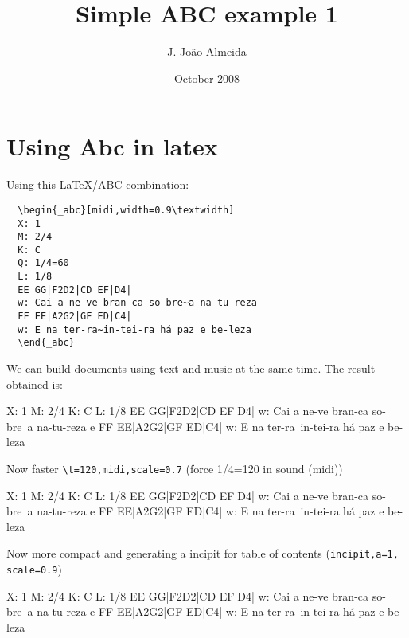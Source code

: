 \documentclass{article}
\begin{document}
\title{Simple ABC example 1}
\author{J. João Almeida}
\date{October 2008}
\maketitle

\tableofcontents

\newpage

\section{Using Abc in latex}

Using this LaTeX/ABC combination:
\begin{Verbatim}
  \begin{_abc}[midi,width=0.9\textwidth]
  X: 1
  M: 2/4
  K: C
  Q: 1/4=60
  L: 1/8
  EE GG|F2D2|CD EF|D4|
  w: Cai a ne-ve bran-ca so-bre~a na-tu-reza 
  FF EE|A2G2|GF ED|C4|
  w: E na ter-ra~in-tei-ra há paz e be-leza
  \end{_abc}

\end{Verbatim}


We can build documents using text and music at the same time.
The result obtained is:

\begin{_abc}[midi,width=0.9\textwidth]
X: 1
M: 2/4
K: C
L: 1/8
EE GG|F2D2|CD EF|D4|
w: Cai a ne-ve bran-ca so-bre~a na-tu-reza e
FF EE|A2G2|GF ED|C4|
w: E na ter-ra~in-tei-ra há paz e be-leza
\end{_abc}

Now faster \verb!\t=120,midi,scale=0.7! (force 1/4=120 in sound (midi))

\begin{_abc}[t=120,midi,scale=0.7]
X: 1
M: 2/4
K: C
L: 1/8
EE GG|F2D2|CD EF|D4|
w: Cai a ne-ve bran-ca so-bre~a na-tu-reza e
FF EE|A2G2|GF ED|C4|
w: E na ter-ra~in-tei-ra há paz e be-leza
\end{_abc}

Now more compact and generating a incipit for table of contents (\verb!incipit,a=1, scale=0.9!)

\begin{_abc}[incipit,t=120,a=1,scale=0.9]
X: 1
M: 2/4
K: C
L: 1/8
EE GG|F2D2|CD EF|D4|
w: Cai a ne-ve bran-ca so-bre~a na-tu-reza e
FF EE|A2G2|GF ED|C4|
w: E na ter-ra~in-tei-ra há paz e be-leza
\end{_abc}
\end{document}
